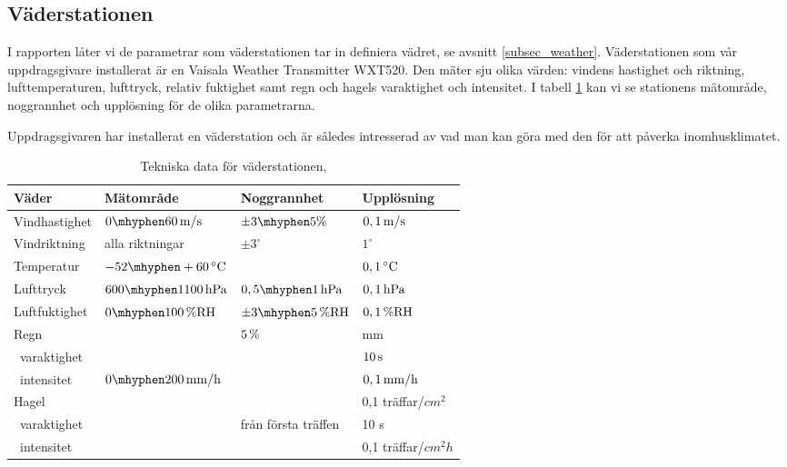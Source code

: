 \subsection{Väderstationen}
\label{subsubsec_weathertransmitter}
I rapporten låter vi de parametrar som väderstationen tar in definiera vädret, se avsnitt \ref{subsec_weather}. Väderstationen som vår uppdragsgivare installerat är en Vaisala Weather Transmitter WXT520. Den mäter sju olika värden: vindens hastighet och riktning, lufttemperaturen, lufttryck, relativ fuktighet samt regn och hagels varaktighet och intensitet. I tabell \ref{tbl:weathertransmitter} kan vi se stationens mätområde, noggrannhet och upplösning för de olika parametrarna.

Uppdragsgivaren har installerat en väderstation och är således intresserad av vad man kan göra med den för att påverka inomhusklimatet.

\begin{table}[htdp]
\caption{Tekniska data för väderstationen, \cite{datasheet_weathertransmitter}}
\begin{center}
\begin{tabular}{|l | l l l|}
\hline
\textbf{Väder} & \textbf{Mätområde} %
 & \textbf{Noggrannhet} %
 & \textbf{Upplösning} \\ %
\hline
\rule{0pt}{3ex}Vindhastighet & $\unit[0\mhyphen 60]{m/s}$ & $\pm 3\mhyphen 5\%$ & $\unit[0,1]{m/s}$ \\ 
\rule{0pt}{3ex}Vindriktning & alla riktningar & $\pm 3^{\circ}$ & $1^{\circ}$ \\
\rule{0pt}{3ex}Temperatur & $\unit[-52\mhyphen +60]{^{\circ}C}$ & & $\unit[0,1]{^{\circ}C}$ \\
\rule{0pt}{3ex}Lufttryck & $\unit[600\mhyphen 1100]{hPa}$ & $\unit[0,5\mhyphen 1]{hPa}$ & $\unit[0,1]{hPa}$ \\
\rule{0pt}{3ex}Luftfuktighet & $\unit[0\mhyphen 100]{\%RH}$ & $\unit[\pm3\mhyphen 5]{\%RH}$ & $\unit[0,1]{\%RH}$ \\
\rule{0pt}{3ex}Regn &  & $\unit[5]{\%}$ & \unit[0,01]{mm} \\
~varaktighet & & & $\unit[10]{s}$\\
~intensitet & $\unit[0\mhyphen 200]{mm/h}$ & & $\unit[0,1]{mm/h}$ \\
\rule{0pt}{3ex}Hagel &  &  & 0,1 träffar/$\unit{cm^2}$ \\
~varaktighet & & från första träffen & 10 s\\
~intensitet & & & 0,1 träffar/$\unit{cm^2h}$\\
\hline
\end{tabular}
\end{center}
\label{tbl:weathertransmitter}
\end{table}
